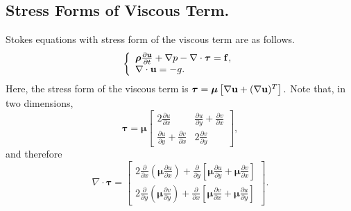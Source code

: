 \documentclass[9pt]{article}
\newcommand{\V}[1]{\boldsymbol{#1}}
\def\ub {{\bf u}}
\def\taub {\boldsymbol{\tau}}
\begin{document}
\subsection{Stress Forms of Viscous Term.}
Stokes equations with stress form of the viscous term are as follows.
\begin{equation}\label{Stress_NS}
 \left \{
        \begin{array} {ll}
        \V{\rho} \frac{\partial \mathbf{u}}{\partial t} + \nabla p - \nabla \cdot{\taub} = \mathbf{f}, \\
   \nabla\cdot{\bf u}=-g.
        \end{array}
               \right.
\end{equation}
Here, the stress form of the viscous term is
$\taub = {\V{\mu}} \left[\nabla\ub + (\nabla\ub)^T\right].$
Note that, in two dimensions,
\begin{equation}\label{strain_rate}
\taub =
{\V{\mu}} \left[\begin{array}{cc}
2\frac{\partial u}{\partial x} & \frac{\partial u}{\partial y} +\frac{\partial v}{\partial x}\\
\frac{\partial u}{\partial y}+\frac{\partial v}{\partial x} & 2\frac{\partial v}{\partial y}
\end{array}\right],
\end{equation}
and therefore
\begin{equation}\label{div_stress}
\nabla\cdot\taub
=
\left[\begin{array}{l}
2\frac{\partial}{\partial x}\left({\V{\mu}} \frac{\partial u}{\partial x}\right) + \frac{\partial}{\partial y}\left[{\V{\mu}} \frac{\partial u}{\partial y} + {\V{\mu}} \frac{\partial v}{\partial x}\right]  \\
2\frac{\partial}{\partial y}\left({\V{\mu}} \frac{\partial v}{\partial y}\right) + \frac{\partial}{\partial x}\left[{\V{\mu}} \frac{\partial v}{\partial x} + {\V{\mu}} \frac{\partial u}{\partial y}\right]
\end{array}\right].
\end{equation}
\end{document}
